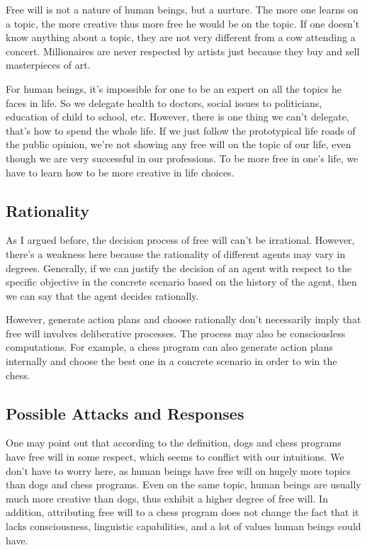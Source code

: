 Free will is not a nature of human beings, but a nurture. The more one learns on a topic, the more creative thus more free he would be on the topic. If one doesn't know anything about a topic, they are not very different from a cow attending a concert. Millionaires are never respected by artists just because they buy and sell masterpieces of art.

For human beings, it's impossible for one to be an expert on all the topics he faces in life. So we delegate health to doctors, social issues to politicians, education of child to school, etc. However, there is one thing we can't delegate, that's how to spend the whole life. If we just follow the prototypical life roads of the public opinion, we're not showing any free will on the topic of our life, even though we are very successful in our professions. To be more free in one's life, we have to learn how to be more creative in life choices.

\subsection{Rationality}

As I argued before, the decision process of free will can't be irrational. However, there’s a weakness here because the rationality of different agents may vary in degrees. Generally, if we can justify the decision of an agent with respect to the specific objective in the concrete scenario based on the history of the agent, then we can say that the agent decides rationally.

However, generate action plans and choose rationally don’t necessarily imply that free will involves deliberative processes. The process may also be consciousless computations. For example, a chess program can also generate action plans internally and choose the best one in a concrete scenario in order to win the chess.

\subsection{Possible Attacks and Responses}

One may point out that according to the definition, dogs and chess programs have free will in some respect, which seems to conflict with our intuitions. We don’t have to worry here, as human beings have free will on hugely more topics than dogs and chess programs. Even on the same topic, human beings are usually much more creative than dogs, thus exhibit a higher degree of free will. In addition, attributing free will to a chess program does not change the fact that it lacks consciousness, linguistic capabilities, and a lot of values human beings could have.

